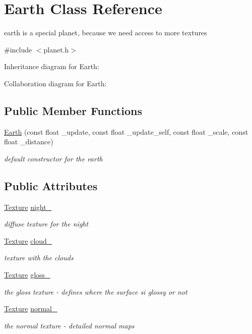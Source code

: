 \hypertarget{classEarth}{}\section{Earth Class Reference}
\label{classEarth}


earth is a special planet, because we need access to more textures  




{\ttfamily \#include $<$planet.\+h$>$}



Inheritance diagram for Earth\+:


Collaboration diagram for Earth\+:
\subsection*{Public Member Functions}
\begin{DoxyCompactItemize}
\item 
\hyperlink{classEarth_aa4eb117e7701caeaf6e2947a415939a5}{Earth} (const float \+\_\+update, const float \+\_\+update\+\_\+self, const float \+\_\+scale, const float \+\_\+distance)
\begin{DoxyCompactList}\small\item\em default constructor for the earth \end{DoxyCompactList}\end{DoxyCompactItemize}
\subsection*{Public Attributes}
\begin{DoxyCompactItemize}
\item 
\hyperlink{classTexture}{Texture} \hyperlink{classEarth_a79c4c581fa5cafc19218e03b5336fe35}{night\+\_\+}
\begin{DoxyCompactList}\small\item\em diffuse texture for the night \end{DoxyCompactList}\item 
\hyperlink{classTexture}{Texture} \hyperlink{classEarth_a276db1eb56e976aa2f267e88e2503023}{cloud\+\_\+}
\begin{DoxyCompactList}\small\item\em texture with the clouds \end{DoxyCompactList}\item 
\hyperlink{classTexture}{Texture} \hyperlink{classEarth_a3871456704afd0fd8cea9a7752117806}{gloss\+\_\+}
\begin{DoxyCompactList}\small\item\em the gloss texture -\/ defines where the surface si glossy or not \end{DoxyCompactList}\item 
\hyperlink{classTexture}{Texture} \hyperlink{classEarth_a70ca723027d252427f59c86f6e6f1791}{normal\+\_\+}
\begin{DoxyCompactList}\small\item\em the normal texture -\/ detailed normal maps \end{DoxyCompactList}\end{DoxyCompactItemize}


